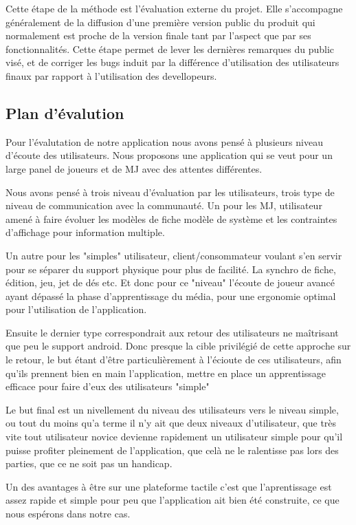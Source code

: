 \documentclass[11pt,a4paper]{article}
\begin{document}
Cette étape de la méthode est l'évaluation externe du projet. Elle s'accompagne
généralement de la diffusion d'une première version public du produit qui
normalement est proche de la version finale tant par l'aspect que par ses
fonctionnalités.
Cette étape permet de lever les dernières remarques du public visé, et de
corriger les bugs induit par la différence d'utilisation des utilisateurs finaux
par rapport à l'utilisation des devellopeurs.


\subsection{Plan d'évalution}

Pour l'évalutation de notre application nous avons pensé à plusieurs niveau d'écoute
des utilisateurs. Nous proposons une application qui se veut pour un large panel 
de joueurs et de MJ avec des attentes différentes.

Nous avons pensé à trois niveau d'évaluation par les utilisateurs, trois type de niveau de communication
 avec la communauté. Un pour les MJ, utilisateur amené à faire évoluer les modèles de fiche modèle de système
et les contraintes d'affichage pour information multiple.

Un autre pour les "simples" utilisateur, client/consommateur voulant s'en servir pour se séparer
du support physique pour plus de facilité. La synchro de fiche, édition, jeu, jet de dés etc.
Et donc pour ce "niveau" l'écoute de joueur avancé ayant dépassé la phase d'apprentissage 
du média, pour une ergonomie optimal pour l'utilisation de l'application. 

Ensuite le dernier type correspondrait aux retour des utilisateurs ne maîtrisant que peu le support
android. Donc presque la cible privilégié de cette approche sur le retour, le but étant d'être particulièrement
à l'écioute de ces utilisateurs, afin qu'ils prennent bien en main l'application, mettre en place un apprentissage
efficace pour faire d'eux des utilisateurs "simple" 

Le but final est un nivellement du niveau des utilisateurs vers le niveau simple, ou tout du moins 
qu'a terme il n'y ait que deux niveaux d'utilisateur, que très vite tout utilisateur novice devienne rapidement
un utilisateur simple pour qu'il puisse profiter pleinement de l'application, que celà ne le ralentisse pas lors 
des parties, que ce ne soit pas un handicap.

Un des avantages à être sur une plateforme tactile c'est que l'aprentissage est assez rapide et simple
pour peu que l'application ait bien été construite, ce que nous espérons dans notre cas.
\end{document}
